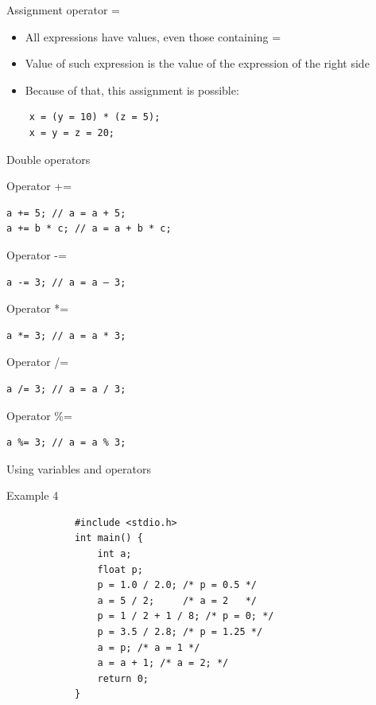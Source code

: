 \begin{frame}[fragile]{Assignment operator =}
\begin{itemize}
\item All expressions have values, even those containing =
\item Value of such expression is the value of the expression of the
right side
\item Because of that, this assignment is possible:
\end{itemize}
\begin{verbatim}
    x = (y = 10) * (z = 5);
    x = y = z = 20;
\end{verbatim}
\end{frame} 

\begin{frame}[fragile,shrink=5]{Double operators}
\begin{block}{Operator +=}
\begin{verbatim}
a += 5; // a = a + 5;
a += b * c; // a = a + b * c;
\end{verbatim}
\end{block}
\begin{block}{Operator -=}
\begin{verbatim}
a -= 3; // a = a – 3;
\end{verbatim}
\end{block}
\begin{block}{Operator *=}
\begin{verbatim}
a *= 3; // a = a * 3;
\end{verbatim}
\end{block}
\begin{block}{Operator /=}
\begin{verbatim}
a /= 3; // a = a / 3;
\end{verbatim}
\end{block}
\begin{block}{Operator \%=}
\begin{verbatim}
a %= 3; // a = a % 3;
\end{verbatim}
\end{block}
\end{frame} 

\begin{frame}[fragile]{Using variables and operators}
    \begin{exampleblock}{Example 4}
        \begin{lstlisting}
            #include <stdio.h>  
            int main() {
                int a;
                float p;
                p = 1.0 / 2.0; /* p = 0.5 */
                a = 5 / 2;     /* a = 2   */
                p = 1 / 2 + 1 / 8; /* p = 0; */
                p = 3.5 / 2.8; /* p = 1.25 */
                a = p; /* a = 1 */
                a = a + 1; /* a = 2; */
                return 0;       
            }
        \end{lstlisting}
    \end{exampleblock}
\end{frame}

